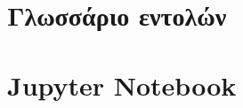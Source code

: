 \documentclass[a4paper,12pt]{book}
\begin{document}
\gr

\pagestyle{plain}

\tableofcontents




\appendix
\chapter{Γλωσσάριο εντολών}
\chapter{{\en Jupyter Notebook}}


\end{document}
